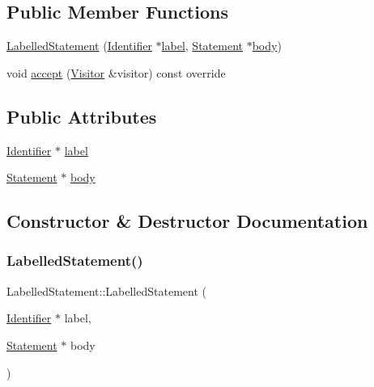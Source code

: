 \subsection*{Public Member Functions}
\begin{DoxyCompactItemize}
\item 
\hyperlink{struct_labelled_statement_aa36aaf969c3e1e4586481d77d646ae7a}{Labelled\+Statement} (\hyperlink{struct_identifier}{Identifier} $\ast$\hyperlink{struct_labelled_statement_aa3cb4a075ce2d599c8e1eca7700100b7}{label}, \hyperlink{struct_statement}{Statement} $\ast$\hyperlink{struct_labelled_statement_a5084b8d01545f2b3a37b036769c55e3a}{body})
\item 
void \hyperlink{struct_labelled_statement_abc283c24da726909de0b3f96b18b7f86}{accept} (\hyperlink{struct_visitor}{Visitor} \&visitor) const override
\end{DoxyCompactItemize}
\subsection*{Public Attributes}
\begin{DoxyCompactItemize}
\item 
\hyperlink{struct_identifier}{Identifier} $\ast$ \hyperlink{struct_labelled_statement_aa3cb4a075ce2d599c8e1eca7700100b7}{label}
\item 
\hyperlink{struct_statement}{Statement} $\ast$ \hyperlink{struct_labelled_statement_a5084b8d01545f2b3a37b036769c55e3a}{body}
\end{DoxyCompactItemize}


\subsection{Constructor \& Destructor Documentation}
\mbox{\label{struct_labelled_statement_aa36aaf969c3e1e4586481d77d646ae7a}} 
\subsubsection{\texorpdfstring{Labelled\+Statement()}{LabelledStatement()}}
{\footnotesize\ttfamily Labelled\+Statement\+::\+Labelled\+Statement (\begin{DoxyParamCaption}\item[{\hyperlink{struct_identifier}{Identifier} $\ast$}]{label,  }\item[{\hyperlink{struct_statement}{Statement} $\ast$}]{body }\end{DoxyParamCaption})\hspace{0.3cm}{\ttfamily [inline]}}




